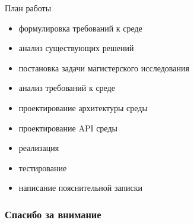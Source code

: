 \documentclass{beamer}
\begin{document}
\begin{frame}{План работы}
    \begin{itemize}
        \item[\checkmark] формулировка требований к среде
        \item[\checkmark] анализ существующих решений
        \item[\checkmark] постановка задачи магистерского исследования
        \item[\checkmark] анализ требований к среде
        \item[\checkmark] проектирование архитектуры среды
        \item проектирование API среды
        \item реализация
        \item тестирование
        \item написание пояснительной записки
    \end{itemize}
\end{frame}

\begin{frame}
\frametitle{Спасибо за внимание}
\end{frame}
\end{document}
